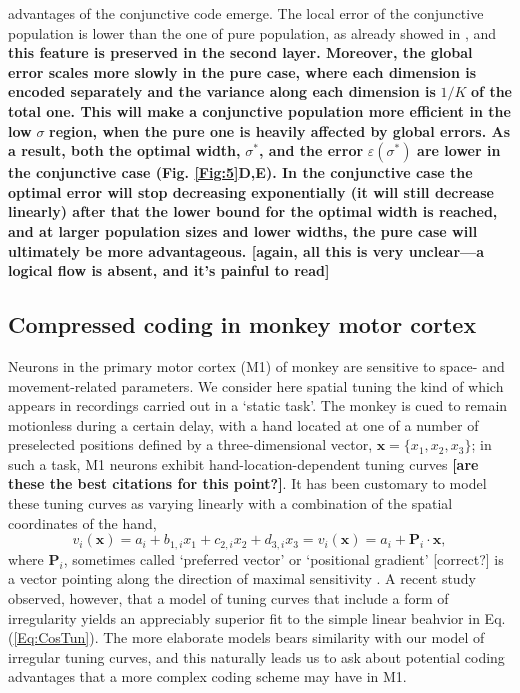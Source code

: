 \documentclass[a4paper]{article}%
\begin{document}
advantages of the conjunctive code emerge. The local error of the conjunctive
population is lower than the one of pure population, as already showed in
\cite{Finkelstein2018OptimalBats}, and \textbf{this feature is preserved in
the second layer. Moreover, the global error scales more slowly in the pure
case, where each dimension is encoded separately and the variance along each
dimension is }$1/K$\textbf{ of the total one. This will make a conjunctive
population more efficient in the low }$\sigma$\textbf{ region, when the pure
one is heavily affected by global errors. As a result, both the optimal width,
}$\sigma^{\ast}$\textbf{, and the error }$\varepsilon(\sigma^{\ast})$\textbf{
are lower in the conjunctive case (Fig. \ref{Fig:5}D,E). In the conjunctive
case the optimal error will stop decreasing exponentially (it will still
decrease linearly) after that the lower bound for the optimal width is
reached, and at larger population sizes and lower widths, the pure case will
ultimately be more advantageous. [again, all this is very unclear---a logical
flow is absent, and it's painful to read]}

\subsection{Compressed coding in monkey motor cortex}

Neurons in the primary motor cortex (M1) of monkey are sensitive to space- and
movement-related parameters. We consider here spatial tuning the kind of which
appears in recordings carried out in a `static task'. The monkey is cued to
remain motionless during a certain delay, with a hand located at one of a
number of preselected positions defined by a three-dimensional vector,
$\mathbf{x}=\{x_{1},x_{2},x_{3}\}$; in such a task, M1 neurons exhibit
hand-location-dependent tuning curves
\cite{Wang2007MotorReaching,Lalazar2016TuningConnectivity} \textbf{[are these
the best citations for this point?]}. It has been customary to model these
tuning curves as varying linearly with a combination of the spatial
coordinates of the hand,
\begin{equation}
v_{i}(\mathbf{x})=a_{i}+b_{1,i}x_{1}+c_{2,i}x_{2}+d_{3,i}x_{3}=v_{i}%
(\mathbf{x})=a_{i}+\mathbf{P}_{i}\cdot\mathbf{x},\label{Eq:CosTun}%
\end{equation}
where $\mathbf{P}_{i}$, sometimes called `preferred vector' or `positional
gradient' [correct?] is a vector pointing along the direction of maximal
sensitivity \cite{Wang2007MotorReaching}. A recent study
\cite{Lalazar2016TuningConnectivity} observed, however, that a model of tuning
curves that include a form of irregularity yields an appreciably superior fit
to the simple linear beahvior in Eq.(\ref{Eq:CosTun}). The more elaborate
models bears similarity with our model of irregular tuning curves, and this
naturally leads us to ask about potential coding advantages that a more
complex coding scheme may have in M1.
\end{document}
